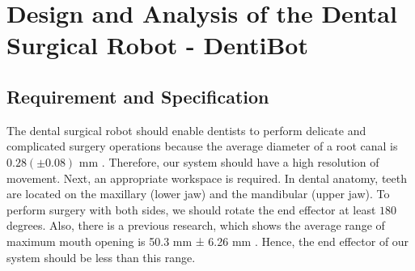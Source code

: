\chapter{Design and Analysis of the Dental Surgical Robot - DentiBot}
\section{Requirement and Specification}
\label{sec:requirement}
\hspace*{6mm}The dental surgical robot should enable dentists to perform delicate and complicated surgery operations because the average diameter of a root canal is $0.28 (\pm 0.08)$ mm \cite{wu2002does}. Therefore, our system should have a high resolution of movement. Next, an appropriate workspace is required. In dental anatomy, teeth are located on the maxillary (lower jaw) and the mandibular (upper jaw). To perform surgery with both sides, we should rotate the end effector at least $180$ degrees. Also, there is a previous research, which shows the average range of maximum mouth opening is 50.3 mm ± 6.26 mm \cite{agrawal2015evaluation}. Hence, the end effector of our system should be less than this range.
